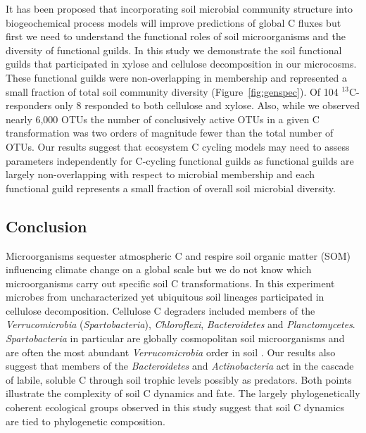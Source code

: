 It has been proposed that incorporating soil microbial community structure
into biogeochemical process models will improve predictions of global
C fluxes \citep{McGuire2010} but first we need to understand the
functional roles of soil microorganisms and the diversity of functional
guilds. In this study we demonstrate the soil functional guilds that
participated in xylose and cellulose decomposition in our microcosms. These
functional guilds were non-overlapping in membership and represented a small
fraction of total soil community diversity (Figure~\ref{fig:genspec}). Of
104 $^{13}$C-responders only 8 responded to both cellulose and xylose.
Also, while we observed nearly 6,000 OTUs the number of conclusively
active OTUs in a given C transformation was two orders of magnitude fewer than
the total number of OTUs. Our results suggest that ecosystem C cycling models
may need to assess parameters independently for C-cycling functional guilds as
functional guilds are largely non-overlapping with respect to microbial
membership and each functional guild represents a small fraction of overall
soil microbial diversity.

\subsection{Conclusion} 
Microorganisms sequester atmospheric C and respire soil organic
matter (SOM) influencing climate change on a global scale but we do not
know which microorganisms carry out specific soil C transformations. In
this experiment microbes from uncharacterized yet ubiquitous soil lineages
participated in cellulose decomposition. Cellulose C degraders included
members of the \textit{Verrucomicrobia} (\textit{Spartobacteria}),
\textit{Chloroflexi}, \textit{Bacteroidetes} and \textit{Planctomycetes}.
\textit{Spartobacteria} in particular are globally cosmopolitan soil
microorganisms and are often the most abundant \textit{Verrucomicrobia}
order in soil \citep{Bergmann_2011}. Our results also suggest that
members of the \textit{Bacteroidetes} and \textit{Actinobacteria} act in
the cascade of labile, soluble C through soil trophic levels possibly as
predators. Both points illustrate the complexity of soil C dynamics and
fate. The largely phylogenetically coherent ecological groups observed in
this study suggest that soil C dynamics are tied to phylogenetic
composition.
